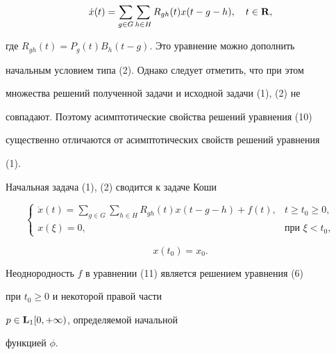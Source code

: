 \begin{equation}


\Dot x(t)=\sum_{g\in G}\sum_{h\in H}R_{gh}(t)x(t-g-h),\quad t\in\bold R,


\end{equation}


%


где $R_{gh}(t)=P_g(t)B_h(t-g)$. Это уравнение можно дополнить


начальным условием типа (2). Однако следует отметить, что при этом


множества решений полученной задачи и исходной задачи (1), (2) не


совпадают. Поэтому асимптотические свойства решений уравнения (10)


существенно отличаются от асимптотических свойств решений уравнения


(1).





Начальная задача (1), (2) сводится к задаче Коши


%


\begin{equation}


\begin{cases}


\Dot x(t)=\sum\limits_{g\in G}\sum\limits_{h\in H}R_{gh}(t)


x(t-g-h)+f(t), &t\ge t_0\ge0,\\


%


x(\xi)=0, & \text{при }\xi< t_0,


\end{cases}


\end{equation}


%


\begin{equation}


x(t_0)=x_0.


\end{equation}


%


Неоднородность $f$ в уравнении (11) является решением уравнения (6)


при $t_0\ge0$ и некоторой правой части


$p\in\bold L_1[0,+\infty)$, определяемой начальной


функцией $\phi$.





